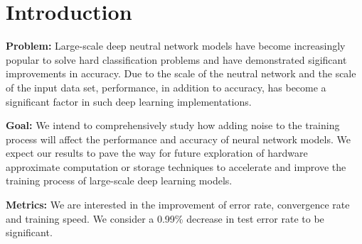 \section{Introduction}
\label{sec:intro}


{\bf Problem:}
Large-scale deep neutral network models have become increasingly popular
to solve hard classification problems and have demonstrated sigificant
improvements in accuracy. Due to the scale of the neutral network and the
scale of the input data set, performance, in addition to accuracy, has
become a significant factor in such deep learning implementations.

{\bf Goal:}
We intend to comprehensively study how adding noise to the training
process will affect the performance and accuracy of neural network models.
We expect our results to pave the way for future exploration of
hardware approximate computation or storage techniques to accelerate
and improve the training process of large-scale deep learning models.

{\bf Metrics:} %
We are interested in the improvement of error rate, convergence rate
and training speed.
We consider a 0.99\% decrease in test error rate to be significant.




